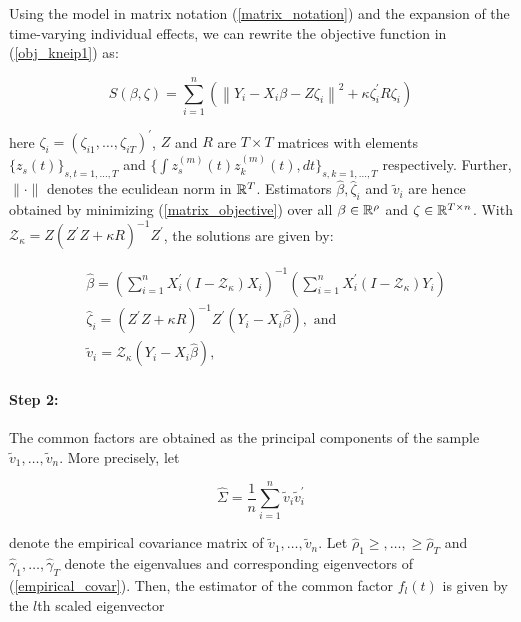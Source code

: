 Using the model in matrix notation (\ref{matrix_notation}) and the expansion of the time-varying individual effects, we can rewrite the objective function in  (\ref{obj_kneip1}) as:

\begin{equation}\label{matrix_objective}
    S(\beta, \zeta)=\sum_{i=1}^n\left(\left\|Y_i-X_i \beta-Z \zeta_i\right\|^2+\kappa \zeta_i^{\prime} R \zeta_i\right)
\end{equation}

here $\zeta_i = (\zeta_{i1}, \ldots, \zeta_{iT})^\prime$, $Z$ and $R$ are $T \times T$ matrices with elements $\{z_s(t)\}_{s,t = 1, \ldots, T}$ and $\{\int z_s^{(m)}(t)z_k^{(m)}(t), dt\}_{s,k=1, \ldots, T}$ respectively. Further, $\| \cdot\|$ denotes the eculidean norm in $\mathbb{R}^T$.   Estimators $\hat{\beta}, \hat{\zeta}_i$ and $\tilde{v}_i$ are hence obtained by minimizing (\ref{matrix_objective}) over all $\beta \in \mathbb{R}^\rho$ and $\zeta \in \mathbb{R}^{T \times n}$. With  $\mathcal{Z}_\kappa=Z\left(Z^{\prime} Z+\kappa R\right)^{-1} Z^{\prime}$, the solutions are given by: 

\begin{equation}
    \begin{aligned}
& \hat{\beta}=\left(\sum_{i=1}^n X_i^{\prime}\left(I-\mathcal{Z}_\kappa\right) X_i\right)^{-1}\left(\sum_{i=1}^n X_i^{\prime}\left(I-\mathcal{Z}_\kappa\right) Y_i\right) \\
& \hat{\zeta}_i=\left(Z^{\prime} Z+\kappa R\right)^{-1} Z^{\prime}\left(Y_i-X_i \hat{\beta}\right), \text { and } \\
& \tilde{v}_i=\mathcal{Z}_\kappa\left(Y_i-X_i \hat{\beta}\right),
\end{aligned}
\end{equation}

\paragraph{Step 2:}\label{step2} The common factors are obtained as the principal components of the sample $\tilde{v}_1, \ldots, \tilde{v}_n$. More precisely, let  

\begin{equation}\label{empirical_covar}
    \hat{\Sigma} = \frac{1}{n} \sum_{i=1}^n \tilde{v}_i \tilde{v}_i^\prime
\end{equation}

denote the empirical covariance matrix of $\tilde{v}_1, \ldots, \tilde{v}_n$. Let $\hat{\rho}_1 \geq,  \ldots, \geq \hat{\rho}_T$ and $\hat{\gamma}_1, \dots, \hat{\gamma}_T$ denote the eigenvalues and corresponding eigenvectors of (\ref{empirical_covar}). Then, the estimator of the common factor $f_l(t)$ is given by the $l$th scaled eigenvector

